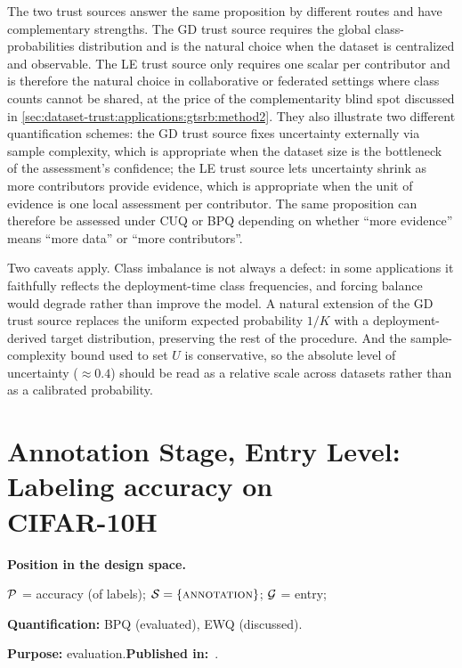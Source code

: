 The two trust sources answer the same proposition by different routes and have complementary strengths. The GD trust source requires the global class-probabilities distribution and is the natural choice when the dataset is centralized and observable. The LE trust source only requires one scalar per contributor and is therefore the natural choice in collaborative or federated settings where class counts cannot be shared, at the price of the complementarity blind spot discussed in \cref{sec:dataset-trust:applications:gtsrb:method2}. They also illustrate two different quantification schemes: the GD trust source fixes uncertainty externally via sample complexity, which is appropriate when the dataset size is the bottleneck of the assessment's confidence; the LE trust source lets uncertainty shrink as more contributors provide evidence, which is appropriate when the unit of evidence is one local assessment per contributor. The same proposition can therefore be assessed under \ac{CUQ} or \ac{BPQ} depending on whether ``more evidence'' means ``more data'' or ``more contributors''.

Two caveats apply. Class imbalance is not always a defect: in some applications it faithfully reflects the deployment-time class frequencies, and forcing balance would degrade rather than improve the model. A natural extension of the GD trust source replaces the uniform expected probability $1/K$ with a deployment-derived target distribution, preserving the rest of the procedure. And the sample-complexity bound used to set $U$ is conservative, so the absolute level of uncertainty ($\approx 0.4$) should be read as a relative scale across datasets rather than as a calibrated probability.

\FloatBarrier

\section{Annotation Stage, Entry Level: Labeling accuracy on \\CIFAR-10H}
\label{sec:dataset-trust:applications:cifar10h}

\begin{mdframed}[backgroundcolor=blue!4, linewidth=0pt]
\textbf{Position in the design space.}

$\mathcal{P}$ = accuracy (of labels);\quad
$\mathcal{S} = \{\textsc{annotation}\}$;\quad
$\mathcal{G}$ = entry;\

\textbf{Quantification:} \ac{BPQ} (evaluated), \ac{EWQ} (discussed).\quad

\textbf{Purpose:} evaluation.\quad \textbf{Published in:}~\cite{trust-aidatatrust}.
\end{mdframed}

